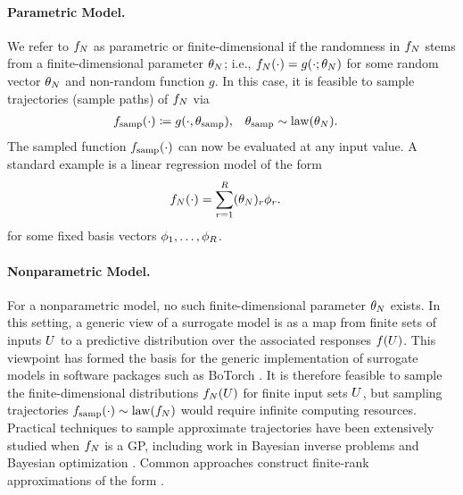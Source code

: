 \documentclass[12pt]{article}
\begin{document}
\paragraph{Parametric Model.}
We refer to $\funcEm[\Ndesign]$ as parametric 
or finite-dimensional if the randomness in $\funcEm[\Ndesign]$ stems from 
a finite-dimensional parameter $\theta_{\Ndesign}$; i.e., 
$\funcEm[\Ndesign](\cdot) = g(\cdot; \theta_{\Ndesign})$ for some 
random vector $\theta_{\Ndesign}$ and non-random function $g$.
In this case, it is feasible to sample trajectories (sample paths) of 
$\funcEm[\Ndesign]$ via 
\begin{align}
&\func_{\mathrm{samp}}(\cdot) \Def g(\cdot, \theta_{\mathrm{samp}}),
&&\theta_{\mathrm{samp}} \sim \mathrm{law}(\theta_{\Ndesign}).
\end{align}
The sampled function $\func_{\mathrm{samp}}(\cdot)$ can now 
be evaluated at any input value. A standard example is a linear 
regression model of the form
\begin{align}
\funcEm[\Ndesign](\cdot) &= \sum_{\idxBasis=1}^{\dimBasis} (\theta_{\Ndesign})_{\idxBasis} \basisVec_{\idxBasis}.
\label{eq:finite-basis}
\end{align}
for some fixed basis vectors $\basisVec_{1}, \dots, \basisVec_{\dimBasis}$.
 
\paragraph{Nonparametric Model.} For a nonparametric model, no such finite-dimensional 
parameter $\theta_{\Ndesign}$ exists. In this setting, a generic view of a 
surrogate model is as a map from finite sets of inputs $\parMat$ to a predictive distribution 
over the associated responses $\func(\parMat)$. This viewpoint has formed the basis 
for the generic implementation of surrogate models in software packages such as 
BoTorch \citep{botorch}. It is therefore feasible to sample the finite-dimensional distributions
$\funcEm[\Ndesign](\parMat)$ for finite input sets $\parMat$, but sampling trajectories
$\func_{\mathrm{samp}}(\cdot) \sim \mathrm{law}(\funcEm[\Ndesign])$ would require 
infinite computing resources. Practical techniques to sample approximate trajectories have been
extensively studied when $\funcEm[\Ndesign]$ is a GP, including work in 
Bayesian inverse problems \citep{dimRedPolyChaos,functionSpaceMCMC} 
and Bayesian optimization \citep{pathwiseConditioning,samplingGPPosts}.
Common approaches construct finite-rank approximations of the form  
.
\end{document}

